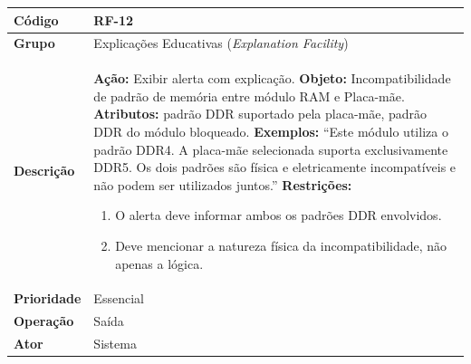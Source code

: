 \FloatBarrier
\begin{quadro}[htb]
  \caption{RF-12 -- Exibir alerta de incompatibilidade de padrão de memória}
  \label{quad:rf12}
  \begin{tabular}{|p{3.2cm}|p{11.8cm}|}
    \hline
    \textbf{Código}     & RF-12                                                              \\ \hline
    \textbf{Grupo}      & Explicações Educativas (\textit{Explanation Facility})             \\ \hline
    \textbf{Descrição}  &
    \textbf{Ação:} Exibir alerta com explicação.
    \textbf{Objeto:} Incompatibilidade de padrão de memória entre módulo RAM e Placa-mãe.
    \textbf{Atributos:} padrão DDR suportado pela placa-mãe, padrão DDR do módulo bloqueado.
    \textbf{Exemplos:} ``Este módulo utiliza o padrão DDR4. A placa-mãe selecionada suporta exclusivamente DDR5. Os dois padrões são física e eletricamente incompatíveis e não podem ser utilizados juntos.''
    \textbf{Restrições:}
    \begin{enumerate}[nosep,leftmargin=1.2em,topsep=2pt,partopsep=0pt,parsep=0pt,itemsep=1pt]
      \item O alerta deve informar ambos os padrões DDR envolvidos.
      \item Deve mencionar a natureza física da incompatibilidade, não apenas a lógica.
    \end{enumerate} \\ \hline
    \textbf{Prioridade} & Essencial                                                          \\ \hline
    \textbf{Operação}   & Saída                                                              \\ \hline
    \textbf{Ator}       & Sistema                                                            \\ \hline
  \end{tabular}
\end{quadro}
\FloatBarrier
